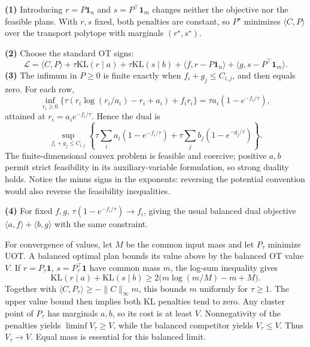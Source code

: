 \documentclass[11pt,a4paper]{article}
\theoremstyle{exostyle}
\begin{document}
\begin{solution}
\textbf{(1)} Introducing $r=P\mathbf1_n$ and $s=P^\top\mathbf1_m$ changes neither the objective nor the feasible plans. With $r,s$ fixed, both penalties are constant, so $P^\star$ minimizes $\langle C,P\rangle$ over the transport polytope with marginals $(r^\star,s^\star)$.

\textbf{(2)} Choose the standard OT signs:
\[
\mathcal L=\langle C,P\rangle+\tau\mathrm{KL}(r\mid a)+\tau\mathrm{KL}(s\mid b)
+\langle f,r-P\mathbf1_n\rangle+\langle g,s-P^\top\mathbf1_m\rangle.
\]
\textbf{(3)} The infimum in $P\ge0$ is finite exactly when $f_i+g_j\le C_{i,j}$, and then equals zero. For each row,
\[
\inf_{r_i\ge0}\{\tau(r_i\log(r_i/a_i)-r_i+a_i)+f_ir_i\}
=\tau a_i(1-e^{-f_i/\tau}),
\]
attained at $r_i=a_ie^{-f_i/\tau}$. Hence the dual is
\[
\sup_{f_i+g_j\le C_{i,j}}
\left\{\tau\sum_i a_i(1-e^{-f_i/\tau})
+\tau\sum_j b_j(1-e^{-g_j/\tau})\right\}.
\]
The finite-dimensional convex problem is feasible and coercive; positive $a,b$ permit strict feasibility in its auxiliary-variable formulation, so strong duality holds. Notice the minus signs in the exponents: reversing the potential convention would also reverse the feasibility inequalities.

\textbf{(4)} For fixed $f,g$, $\tau(1-e^{-f_i/\tau})\to f_i$, giving the usual balanced dual objective $\langle a,f\rangle+\langle b,g\rangle$ with the same constraint.

For convergence of values, let $M$ be the common input mass and let $P_\tau$ minimize UOT. A balanced optimal plan bounds its value above by the balanced OT value $V$. If $r=P_\tau\mathbf1$, $s=P_\tau^\top\mathbf1$ have common mass $m$, the log-sum inequality gives
\[
\mathrm{KL}(r\mid a)+\mathrm{KL}(s\mid b)
\ge2\bigl(m\log(m/M)-m+M\bigr).
\]
Together with $\langle C,P_\tau\rangle\ge-\|C\|_\infty m$, this bounds $m$ uniformly for $\tau\ge1$. The upper value bound then implies both KL penalties tend to zero. Any cluster point of $P_\tau$ has marginals $a,b$, so its cost is at least $V$. Nonnegativity of the penalties yields $\liminf V_\tau\ge V$, while the balanced competitor yields $V_\tau\le V$. Thus $V_\tau\to V$. Equal mass is essential for this balanced limit.
\end{solution}
\end{document}
